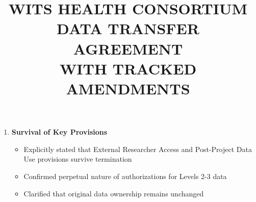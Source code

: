 \begin{enumerate}
\item \textbf{Survival of Key Provisions}
   \begin{itemize}
   \item Explicitly stated that External Researcher Access and Post-Project Data Use provisions survive termination
   \item Confirmed perpetual nature of authorizations for Levels 2-3 data
   \item Clarified that original data ownership remains unchanged
   \end{itemize}
\end{enumerate}

\documentclass[12pt,letterpaper]{article}
\usepackage{geometry}
\geometry{margin=1in}
\usepackage{titlesec}
\usepackage{enumitem}
\usepackage{xcolor}
\usepackage{soul} %
\usepackage{ulem} %
\usepackage{hyperref}
\hypersetup{
    colorlinks=true,
    linkcolor=blue,
    filecolor=magenta,
    urlcolor=blue,
}


\newcommand{\deleted}[1]{\textcolor{deletecolor}{\sout{#1}}}
\newcommand{\added}[1]{\textcolor{addcolor}{#1}}

\titleformat{\section}
  {\normalfont\Large\bfseries}{\thesection}{1em}{}
\titleformat{\subsection}
  {\normalfont\large\bfseries}{\thesubsection}{1em}{}


\title{\textbf{WITS HEALTH CONSORTIUM\\DATA TRANSFER AGREEMENT\\WITH TRACKED AMENDMENTS}}
\author{}
\date{}



\maketitle
\author{}
\date{}



\maketitle

